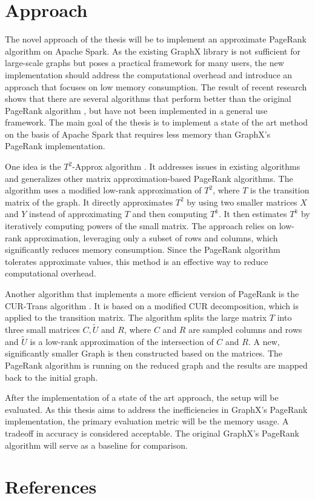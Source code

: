 \documentclass[a4paper,12pt]{article}
\begin{document}
\begin{multicols}{2}
\section{Approach}
The novel approach of the thesis will be to implement an approximate PageRank algorithm on Apache Spark. As the existing GraphX library is not sufficient for large-scale graphs but poses a practical framework for many users, the new implementation should address the computational overhead and introduce an approach that focuses on low memory consumption. 
The result of recent research shows that there are several algorithms that perform better than the original PageRank algorithm \cite{wu_efficient_2024}, but have not been implemented in a general use framework. The main goal of the thesis is to implement a state of the art method on the basis of Apache Spark that requires less memory than GraphX's PageRank implementation. 

One idea is the $T^2$-Approx algorithm \cite{wu_efficient_2024}. It addresses issues in existing algorithms and generalizes other matrix approximation-based PageRank algorithms. The algorithm uses a modified low-rank approximation of $T^2$, where $T$ is the transition matrix of the graph. It directly approximates $T^2$ by using two smaller matrices $X$ and $Y$ instead of approximating $T$ and then computing $T^k$. It then estimates $T^k$ by iteratively computing powers of the small matrix. The approach relies on low-rank approximation, leveraging only a subset of rows and columns, which significantly reduces memory consumption. Since the PageRank algorithm tolerates approximate values, this method is an effective way to reduce computational overhead.

Another algorithm that implements a more efficient version of PageRank is the CUR-Trans algorithm \cite{wu_efficient_2024}. It is based on a modified CUR decomposition, which is applied to the transition matrix. The algorithm splits the large matrix $T$ into three small matrices $C, \tilde{U}$ and $R$, where $C$ and $R$ are sampled columns and rows and $\tilde{U}$ is a low-rank approximation of the intersection of $C$ and $R$. A new, significantly smaller Graph is then constructed based on the matrices. The PageRank algorithm is running on the reduced graph and the results are mapped back to the initial graph.

After the implementation of a state of the art approach, the setup will be evaluated. As this thesis aims to address the inefficiencies in GraphX's PageRank implementation, the primary evaluation metric will be the memory usage. A tradeoff in accuracy is considered acceptable. The original GraphX's PageRank algorithm will serve as a baseline for comparison. 



\section{References}

\end{multicols}
\end{document}
